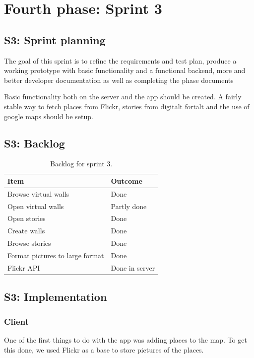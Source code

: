 \documentclass[11pt]{book}
\begin{document}
\section{Fourth phase: Sprint 3}
\subsection{S3: Sprint planning}
The goal of this sprint is to refine the requirements and test plan, produce a working prototype with basic functionality and a functional backend, more and better developer documentation as well as completing the phase documents

Basic functionality both on the server and the app should be created. A fairly stable way to fetch places from Flickr, stories from digitalt fortalt and the use of google maps should be setup.

\subsection{S3: Backlog}
\begin{table}[H]
    \centering
    \begin{tabular}{| l | l |} \hline
        Item                                                                & Outcome         \\ \hline
        Browse virtual walls & Done\\ \hline
        Open virtual walls & Partly done\\ \hline
        Open stories & Done\\ \hline
        Create walls & Done\\ \hline
        Browse stories & Done\\ \hline
        Format pictures to large format & Done\\ \hline
        Flickr API & Done in server\\ \hline
    \end{tabular}
    \caption{Backlog for sprint 3.}
    \label{tab:phase_sprint3_backlog}
\end{table}

\subsection{S3: Implementation}

\subsubsection{Client}
One of the first things to do with the app was adding places to the map. To get this done, we used Flickr as a base to store pictures of the places.
\end{document}
